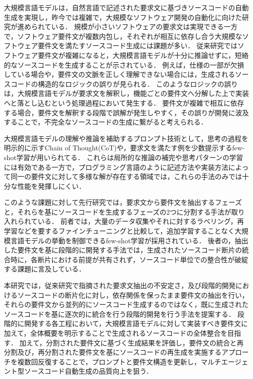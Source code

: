\documentclass[11pt]{jreport}
\begin{document}
大規模言語モデルは，自然言語で記述された要求文に基づきソースコードの自動生成を実現し，昨今では複雑で，大規模なソフトウェア開発の自動化に向けた研究が進められている\cite{LLM_Code_Generation}．
規模が小さいソフトウェアの要求文は実現できる一方で，ソフトウェア要件文が複数内包し，それぞれが相互に依存し合う大規模なソフトウェア要件文を満たすソースコード生成には課題が多い．
従来研究ではソフトウェア要件文が複雑になると，大規模言語モデルが十分に推論せずに，短絡的なソースコードを生成することが示されている\cite{Abandonment_of_Inference}．
例えば，仕様の一部が欠損している場合や，要件文の文脈を正しく理解できない場合には，生成されるソースコードの構造的なロジックの誤りが見られる．
このようなロジックの誤りは，大規模言語モデルが要求文を解釈し，機能ごとの要件文へ分解した上で実装へと落とし込むという処理過程において発生する．
要件文が複雑で相互に依存する場合，要件文を解釈する段階で誤解が発生しやすく，その誤りが開発に波及することで，不完全なソースコードの生成に繋がると考えられる．

大規模言語モデルの理解や推論を補助するプロンプト技術として，思考の過程を明示的に示すChain of Thought(CoT)や，要求文を満たす例を少数提示するfew-shot学習が用いられてる\cite{LLM_few_shot}．
これらは局所的な推論の補完や思考パターンの学習には有効である一方で，プログラミング言語のように記述方法や実装方法によって同一の要件文に対して多様な解が存在する領域では，これらの手法のみでは十分な性能を発揮しにくい．

このような課題に対して先行研究では，要求文から要件文を抽出するフェーズと，それらを基にソースコードを生成するフェーズの2つに分割する手法が取り入れられている\cite{TOSEM}．
前者では，大量のデータ収集やそれに対するラベリング，再学習などを要するファインチューニングと比較して，追加学習することなく大規模言語モデルの挙動を制御できるfew-shot学習が採用されている．
後者の，抽出した要件文を基に段階的に開発する手法では，生成されたソースコード断片の統合時に，各断片における前提が共有されず，ソースコード単位での整合性が破綻する課題に言及している．

本研究では，従来研究\cite{TOSEM}で指摘された要求文抽出の不安定さ，及び段階的開発におけるソースコードの断片化に対し，依存関係を保ったまま要件文の抽出を行い，それらの要件文から並列的にソースコード生成するのではなく，既に生成されたソースコードを基に逐次的に統合を行う段階的開発を行う手法を提案する．
段階的に開発する各工程において，大規模言語モデルに対して実装すべき要件文に加えて，全体概要を明示することで生成されるソースコードの全体整合を目指す．
加えて，分割された要件文に基づく生成結果を評価し，要件文の統合と再分割及び，再分割された要件文を基にソースコードの再生成を実施するアプローチを複数回反復することで，プロンプトと要件文構造を更新し，マルチエージェント型ソースコード自動生成の品質向上を狙う．
\end{document}
